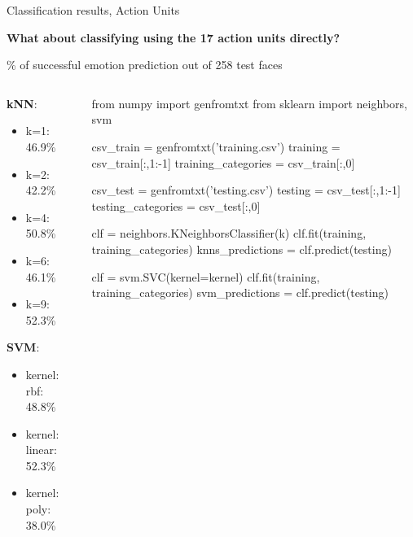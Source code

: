 \documentclass[compress]{beamer}
\begin{document}
\begin{frame}[fragile]{Classification results, Action Units}
    

    \begin{center}
        {\bf What about classifying using the 17 action units directly?}
    \end{center}


    \% of successful emotion prediction out of 258 test faces
    \begin{columns}
        \begin{column}{0.4\linewidth}
    {\bf kNN}:
    \begin{itemize}
        \item k=1: 46.9\%
        \item k=2: 42.2\%
        \item k=4: 50.8\%
        \item k=6: 46.1\%
        \item k=9: 52.3\%
    \end{itemize}

    {\bf SVM}:

    \begin{itemize}
        \item kernel: rbf: 48.8\%
        \item kernel: linear: 52.3\%
        \item kernel: poly: 38.0\%
    \end{itemize}

        \end{column}
        \begin{column}{0.6\linewidth}
            \begin{pythoncode}
from numpy import genfromtxt
from sklearn import neighbors, svm

csv_train = genfromtxt('training.csv')
training = csv_train[:,1:-1]
training_categories = csv_train[:,0]

csv_test = genfromtxt('testing.csv')
testing = csv_test[:,1:-1]
testing_categories = csv_test[:,0]

clf = neighbors.KNeighborsClassifier(k)
clf.fit(training, training_categories)
knns_predictions = clf.predict(testing)

clf = svm.SVC(kernel=kernel)
clf.fit(training, training_categories)
svm_predictions = clf.predict(testing)

            \end{pythoncode}
        \end{column}
    \end{columns}

\end{frame}
\end{document}
